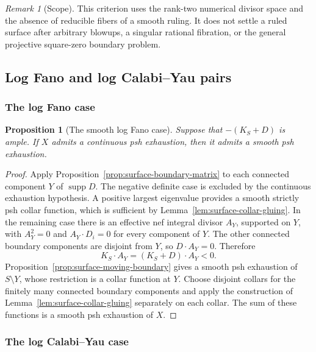 \documentclass[11pt]{amsart}
\newtheorem{proposition}[theorem]{Proposition}
\theoremstyle{definition}
\theoremstyle{remark}
\newtheorem{remark}[theorem]{Remark}
\numberwithin{equation}{section}
\newcommand{\supp}{\operatorname{supp}}
\begin{document}
\begin{remark}[Scope]
This criterion uses the rank-two numerical divisor space and the absence
of reducible fibers of a smooth ruling. It does not settle a ruled surface
after arbitrary blowups, a singular rational fibration, or the general
projective square-zero boundary problem.
\end{remark}

\subsection{Log Fano and log Calabi--Yau pairs}

\subsubsection{The log Fano case}

\begin{proposition}[The smooth log Fano case]
\label{prop:surface-log-fano}
Suppose that $-(K_S+D)$ is ample.  If $X$ admits a continuous psh
exhaustion, then it admits a smooth psh exhaustion.
\end{proposition}

\begin{proof}
Apply Proposition~\ref{prop:surface-boundary-matrix} to each connected
component $Y$ of $\supp D$.  The negative definite case is excluded
by the continuous exhaustion hypothesis.  A positive largest eigenvalue
provides a smooth strictly psh collar function, which is sufficient by
Lemma~\ref{lem:surface-collar-gluing}.  In the remaining case there
is an effective nef integral divisor $A_Y$, supported on $Y$, with
$A_Y^2=0$ and $A_Y\cdot D_i=0$ for every component of $Y$.
The other connected boundary components are disjoint from $Y$, so
$D\cdot A_Y=0$.  Therefore
\[
 K_S\cdot A_Y=(K_S+D)\cdot A_Y<0.
\]
Proposition~\ref{prop:surface-moving-boundary} gives a smooth psh
exhaustion of $S\setminus Y$, whose restriction is a collar function
at $Y$.  Choose disjoint collars for the finitely many connected
boundary components and apply the construction of
Lemma~\ref{lem:surface-collar-gluing} separately on each collar.
The sum of these functions is a smooth psh exhaustion of $X$.
\end{proof}

\subsubsection{The log Calabi--Yau case}
\end{document}
